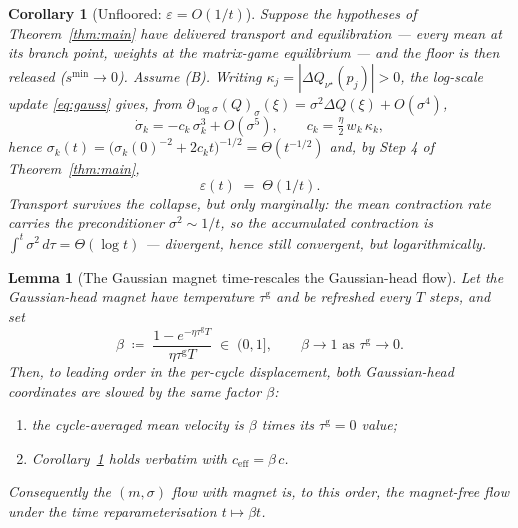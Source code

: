 \documentclass[11pt]{article}
\newtheorem{lemma}{Lemma}
\newtheorem{corollary}{Corollary}
\theoremstyle{definition}
\begin{document}
\begin{corollary}[Unfloored: $\varepsilon = O(1/t)$]\label{cor:unfloored}
Suppose the hypotheses of Theorem~\ref{thm:main} have delivered transport and
equilibration --- every mean at its branch point, weights at the matrix-game
equilibrium --- and the floor is then released ($s^{\min} \to 0$). Assume (B).
Writing $\kappa_j = |\Delta Q_{\nu^\star}(p_j)| > 0$, the log-scale update
\eqref{eq:gauss} gives, from $\partial_{\log \sigma}(Q)_\sigma(\xi) = \sigma^2
\Delta Q(\xi) + O(\sigma^4)$,
\begin{equation}
  \dot\sigma_k = -c_k\,\sigma_k^3 + O(\sigma^5),
  \qquad c_k = \tfrac{\eta}{2}\, w_k\, \kappa_k ,
\end{equation}
hence $\sigma_k(t) = \big(\sigma_k(0)^{-2} + 2c_k t\big)^{-1/2} = \Theta(t^{-1/2})$
and, by Step 4 of Theorem~\ref{thm:main},
\begin{equation}
  \varepsilon(t) \;=\; \Theta(1/t).
\end{equation}
Transport survives the collapse, but only marginally: the mean contraction rate
carries the preconditioner $\sigma^2 \sim 1/t$, so the accumulated contraction is
$\int^t \sigma^2 \,d\tau = \Theta(\log t)$ --- divergent, hence still convergent,
but logarithmically.
\end{corollary}

\begin{lemma}[The Gaussian magnet time-rescales the Gaussian-head flow]
\label{lem:brake}
Let the Gaussian-head magnet have temperature $\tau^{\mathrm g}$ and be refreshed
every $T$ steps, and set
\begin{equation}\label{eq:brake}
  \beta \;\coloneqq\; \frac{1 - e^{-\eta \tau^{\mathrm g} T}}
                            {\eta \tau^{\mathrm g} T} \;\in\; (0, 1] ,
  \qquad \beta \to 1 \text{ as } \tau^{\mathrm g} \to 0 .
\end{equation}
Then, to leading order in the per-cycle displacement, \emph{both} Gaussian-head
coordinates are slowed by the same factor $\beta$:
\begin{enumerate}
\item[(i)] the cycle-averaged mean velocity is $\beta$ times its
  $\tau^{\mathrm g} = 0$ value;
\item[(ii)] Corollary~\ref{cor:unfloored} holds verbatim with
  $c_{\mathrm{eff}} = \beta\, c$.
\end{enumerate}
Consequently the $(m,\sigma)$ flow with magnet is, to this order, the
magnet-free flow under the time reparameterisation $t \mapsto \beta t$.
\end{lemma}
\end{document}

